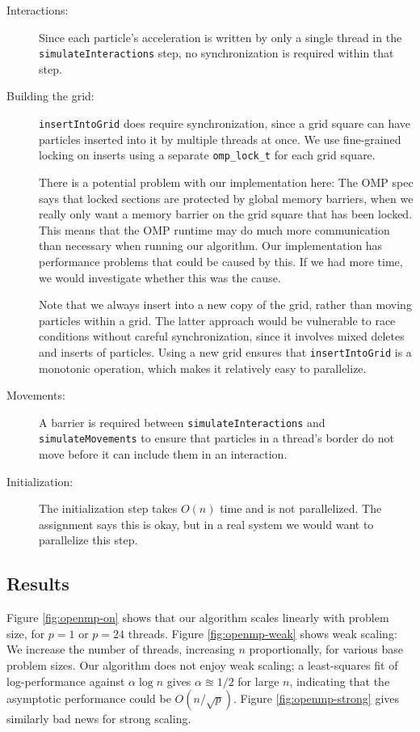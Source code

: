 \documentclass{article}
\newcommand{\code}[1]%
  {\texttt{#1}}
\begin{document}
\begin{description}
  \item[Interactions:] Since each particle's acceleration is written by only a single thread in the \code{simulateInteractions} step, no synchronization is required within that step.
  \item[Building the grid:] \code{insertIntoGrid} does require synchronization, since a grid square can have particles inserted into it by multiple threads at once.  We use fine-grained locking on inserts using a separate \code{omp\_lock\_t} for each grid square.
  
  There is a potential problem with our implementation here: The OMP spec says that locked sections are protected by global memory barriers, when we really only want a memory barrier on the grid square that has been locked.  This means that the OMP runtime may do much more communication than necessary when running our algorithm.  Our implementation has performance problems that could be caused by this.  If we had more time, we would investigate whether this was the cause.
  
  Note that we always insert into a new copy of the grid, rather than moving particles within a grid.  The latter approach would be vulnerable to race conditions without careful synchronization, since it involves mixed deletes and inserts of particles.  Using a new grid ensures that \code{insertIntoGrid} is a monotonic operation, which makes it relatively easy to parallelize.  
  \item[Movements:] A barrier is required between \code{simulateInteractions} and \code{simulateMovements} to ensure that particles in a thread's border do not move before it can include them in an interaction.
  \item[Initialization:] The initialization step takes $O(n)$ time and is not parallelized.  The assignment says this is okay, but in a real system we would want to parallelize this step.
\end{description}

\subsection{Results}
Figure \ref{fig:openmp-on} shows that our algorithm scales linearly with problem size, for $p=1$ or $p=24$ threads.  Figure \ref{fig:openmp-weak} shows weak scaling: We increase the number of threads, increasing $n$ proportionally, for various base problem sizes.  Our algorithm does not enjoy weak scaling; a least-squares fit of log-performance against $\alpha \log n$ gives $\alpha \approxeq 1/2$ for large $n$, indicating that the asymptotic performance could be $O(n/\sqrt{p})$.  Figure \ref{fig:openmp-strong} gives similarly bad news for strong scaling.
\end{document}
